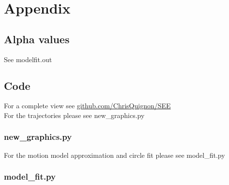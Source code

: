 \documentclass{scrartcl}
\begin{document}
\section{Appendix}
\subsection{Alpha values}
See modelfit.out
%


\subsection{Code}
For a complete view see \href{https://github.com/ChrisQuignon/SEE/tree/master/Homework04}{github.com/ChrisQuignon/SEE}\\
For the trajectories please see new\_graphics.py\\
\subsubsection{new\_graphics.py}

For the motion model approximation and circle fit please see model\_fit.py \\
\subsubsection{model\_fit.py}
















%


\end{document}
